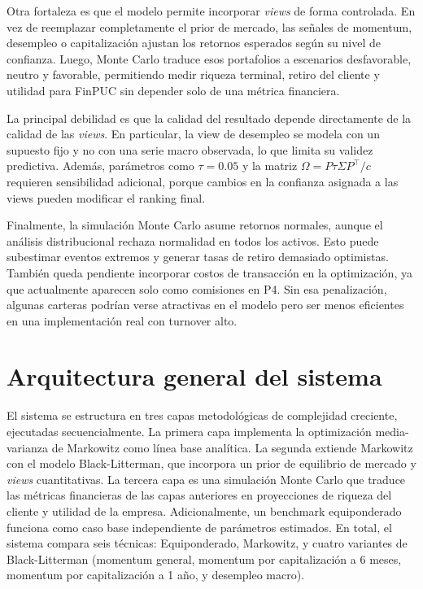 Otra fortaleza es que el modelo permite incorporar \textit{views} de forma controlada. En vez de reemplazar completamente el prior de mercado, las se\~nales de momentum, desempleo o capitalizaci\'on ajustan los retornos esperados seg\'un su nivel de confianza. Luego, Monte Carlo traduce esos portafolios a escenarios desfavorable, neutro y favorable, permitiendo medir riqueza terminal, retiro del cliente y utilidad para FinPUC sin depender solo de una m\'etrica financiera.

La principal debilidad es que la calidad del resultado depende directamente de la calidad de las \textit{views}. En particular, la view de desempleo se modela con un supuesto fijo y no con una serie macro observada, lo que limita su validez predictiva. Adem\'as, par\'ametros como $\tau = 0.05$ y la matriz $\Omega = P\tau\Sigma P^\top / c$ requieren sensibilidad adicional, porque cambios en la confianza asignada a las views pueden modificar el ranking final.

Finalmente, la simulaci\'on Monte Carlo asume retornos normales, aunque el an\'alisis distribucional rechaza normalidad en todos los activos. Esto puede subestimar eventos extremos y generar tasas de retiro demasiado optimistas. Tambi\'en queda pendiente incorporar costos de transacci\'on en la optimizaci\'on, ya que actualmente aparecen solo como comisiones en P4. Sin esa penalizaci\'on, algunas carteras podr\'ian verse atractivas en el modelo pero ser menos eficientes en una implementaci\'on real con turnover alto.


\section{Arquitectura general del sistema}

El sistema se estructura en tres capas metodol\'ogicas de complejidad
creciente, ejecutadas secuencialmente. La primera capa implementa la
optimizaci\'on media-varianza de Markowitz como l\'inea base anal\'itica. La
segunda extiende Markowitz con el modelo Black-Litterman, que incorpora un
prior de equilibrio de mercado y \textit{views} cuantitativas. La tercera capa
es una simulaci\'on Monte Carlo que traduce las m\'etricas financieras de las
capas anteriores en proyecciones de riqueza del cliente y utilidad de la
empresa. Adicionalmente, un benchmark equiponderado funciona como caso base
independiente de par\'ametros estimados. En total, el sistema compara seis
t\'ecnicas: Equiponderado, Markowitz, y cuatro variantes de Black-Litterman
(momentum general, momentum por capitalizaci\'on a 6 meses, momentum por
capitalizaci\'on a 1 a\~no, y desempleo macro).

